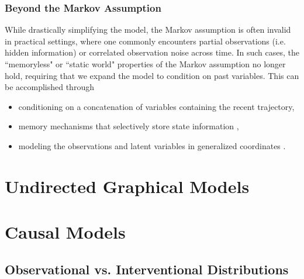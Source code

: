
\subsubsection{Beyond the Markov Assumption}
While drastically simplifying the model, the Markov assumption is often invalid in practical settings, where one commonly encounters partial observations (i.e. hidden information) or correlated observation noise across time. In such cases, the ``memoryless" or ``static world" properties of the Markov assumption no longer hold, requiring that we expand the model to condition on past variables. This can be accomplished through
\begin{itemize}
	\item conditioning on a concatenation of variables containing the recent trajectory,
	\item memory mechanisms that selectively store state information \cite{chung2015recurrent, fraccaro2016sequential, gemici2017generative},
	\item modeling the observations and latent variables in generalized coordinates \cite{friston2010generalised}.
\end{itemize}

\section{Undirected Graphical Models}
\label{sec: undirected models}


\section{Causal Models}
\label{sec: causal models}

\subsection{Observational vs. Interventional Distributions}

